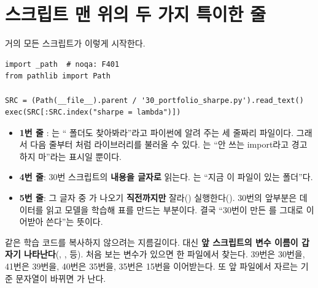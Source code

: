 \section{스크립트 맨 위의 두 가지 특이한 줄}
거의 모든 스크립트가 이렇게 시작한다.
\begin{lstlisting}
import _path  # noqa: F401
from pathlib import Path

SRC = (Path(__file__).parent / '30_portfolio_sharpe.py').read_text()
exec(SRC[:SRC.index("sharpe = lambda")])
\end{lstlisting}
\begin{itemize}[leftmargin=*]
\item \textbf{1번 줄} : 는 `` 폴더도 찾아봐라''라고 파이썬에 알려 주는 세 줄짜리 파일이다. 그래서 다음 줄부터 처럼 라이브러리를 불러올 수 있다. 는 ``안 쓰는 import라고 경고하지 마''라는 표시일 뿐이다.
\item \textbf{4번 줄}: 30번 스크립트의 \textbf{내용을 글자로} 읽는다. 는 ``지금 이 파일이 있는 폴더''다.
\item \textbf{5번 줄}: 그 글자 중 가 나오기 \textbf{직전까지만} 잘라() 실행한다(). 30번의 앞부분은 데이터를 읽고 모델을 학습해  표를 만드는 부분이다. 결국 ``30번이 만든 를 그대로 이어받아 쓴다''는 뜻이다.
\end{itemize}
\begin{warnbox}
같은 학습 코드를 복사하지 않으려는 지름길이다. 대신 \textbf{앞 스크립트의 변수 이름이 갑자기 나타난다}(, ,  등). 처음 보는 변수가 있으면 한 파일에서 찾는다. 39번은 30번을, 41번은 39번을, 40번은 35번을, 35번은 15번을 이어받는다. 또 앞 파일에서 자르는 기준 문자열이 바뀌면 가 난다.
\end{warnbox}
